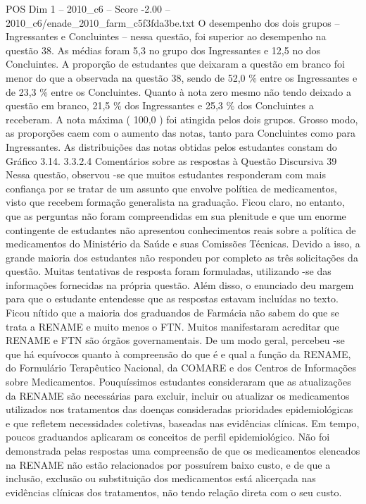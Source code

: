 \begin{textsample}{POS Dim 1 – 2010\_c6 – Score -2.00 – 2010\_c6/enade\_2010\_farm\_c5f3fda3be.txt}
O desempenho dos dois grupos – Ingressantes e Concluintes – nessa questão, foi superior ao desempenho na questão 38.
As médias foram 5,3 no grupo dos Ingressantes e 12,5 no dos Concluintes.
A proporção de estudantes que deixaram a questão em branco foi menor do que a observada na questão 38, sendo de 52,0 \% entre os Ingressantes e de 23,3 \% entre os Concluintes.
Quanto à nota zero mesmo não tendo deixado a questão em branco, 21,5 \% dos Ingressantes e 25,3 \% dos Concluintes a receberam.
A nota máxima ( 100,0 ) foi atingida pelos dois grupos.
Grosso modo, as proporções caem com o aumento das notas, tanto para Concluintes como para Ingressantes.
As distribuições das notas obtidas pelos estudantes constam do Gráfico 3.14. 3.3.2.4 Comentários sobre as respostas à Questão Discursiva 39 Nessa questão, observou -se que muitos estudantes responderam com mais confiança por se tratar de um assunto que envolve política de medicamentos, visto que recebem formação generalista na graduação.
Ficou claro, no entanto, que as perguntas não foram compreendidas em sua plenitude e que um enorme contingente de estudantes não apresentou conhecimentos reais sobre a política de medicamentos do Ministério da Saúde e suas Comissões Técnicas.
Devido a isso, a grande maioria dos estudantes não respondeu por completo as três solicitações da questão.
Muitas tentativas de resposta foram formuladas, utilizando -se das informações fornecidas na própria questão.
Além disso, o enunciado deu margem para que o estudante entendesse que as respostas estavam incluídas no texto.
Ficou nítido que a maioria dos graduandos de Farmácia não sabem do que se trata a RENAME e muito menos o FTN.
Muitos manifestaram acreditar que RENAME e FTN são órgãos governamentais.
De um modo geral, percebeu -se que há equívocos quanto à compreensão do que é e qual a função da RENAME, do Formulário Terapêutico Nacional, da COMARE e dos Centros de Informações sobre Medicamentos.
Pouquíssimos estudantes consideraram que as atualizações da RENAME são necessárias para excluir, incluir ou atualizar os medicamentos utilizados nos tratamentos das doenças consideradas prioridades epidemiológicas e que refletem necessidades coletivas, baseadas nas evidências clínicas.
Em tempo, poucos graduandos aplicaram os conceitos de perfil epidemiológico.
Não foi demonstrada pelas respostas uma compreensão de que os medicamentos elencados na RENAME não estão relacionados por possuírem baixo custo, e de que a inclusão, exclusão ou substituição dos medicamentos está alicerçada nas evidências clínicas dos tratamentos, não tendo relação direta com o seu custo.

\end{textsample}

